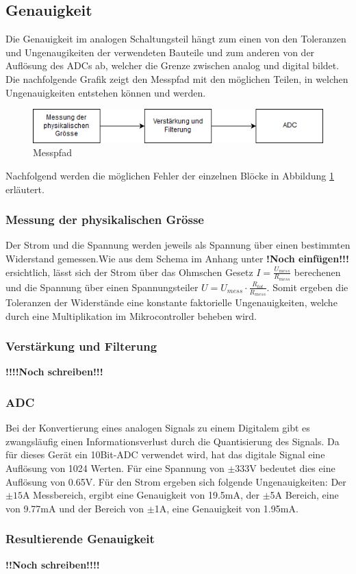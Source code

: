 \subsection{Genauigkeit}%
Die Genauigkeit im analogen Schaltungsteil hängt zum einen von den Toleranzen und Ungenaugikeiten der verwendeten Bauteile und zum anderen von der Auflösung des ADCs ab, welcher die Grenze zwischen analog und digital bildet. Die nachfolgende Grafik zeigt den Messpfad mit den möglichen Teilen, in welchen Ungenauigkeiten entstehen können und werden.

\begin{figure}[htb]

	\includegraphics[width=160mm]{images/genauigkeit.png}

	\caption{Messpfad} %
  
	\label{fig:genauigkeit}

\end{figure}

Nachfolgend werden die möglichen Fehler der einzelnen Blöcke in Abbildung \ref{fig:genauigkeit} erläutert.

\subsubsection*{Messung der physikalischen Grösse}
Der Strom und die Spannung werden jeweils als Spannung über einen bestimmten Widerstand gemessen.Wie aus dem Schema im Anhang unter \textbf{!Noch einfügen!!!} ersichtlich, lässt sich der Strom über das Ohmschen Gesetz $I = \frac{U_{mess}}{R_{mess}}$ berechenen und die Spannung über einen Spannungsteiler $U = U_{mess} \cdot \frac{R_{tot}}{R_{mess}}$. Somit ergeben die Toleranzen der Widerstände eine konstante faktorielle Ungenauigkeiten, welche durch eine Multiplikation im Mikrocontroller beheben wird.

\subsubsection*{Verstärkung und Filterung}
\textbf{!!!!Noch schreiben!!!}

\subsubsection*{ADC}
Bei der Konvertierung eines analogen Signals zu einem Digitalem gibt es zwangsläufig einen Informationsverlust durch die Quantisierung des Signals. Da für dieses Gerät ein 10Bit-ADC verwendet wird, hat das digitale Signal eine Auflösung von 1024 Werten. Für eine Spannung von $\pm$333V bedeutet dies eine Auflösung von 0.65V. Für den Strom ergeben sich folgende Ungenauigkeiten: Der $\pm 15$A Messbereich, ergibt eine Genauigkeit von 19.5mA, der $\pm$5A Bereich, eine von 9.77mA und der Bereich von $\pm$1A, eine Genauigkeit von 1.95mA.

\subsubsection*{Resultierende Genauigkeit} 
\textbf{!!Noch schreiben!!!!}






\pagebreak